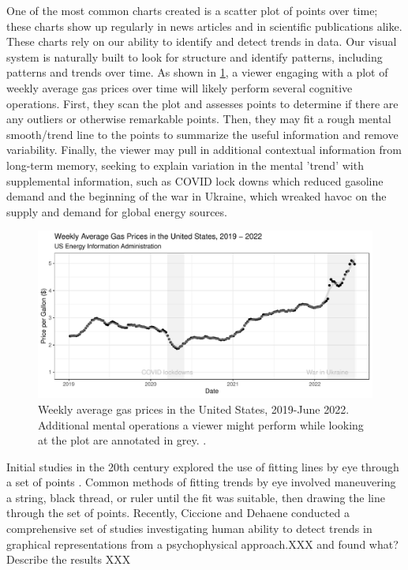 \documentclass[10pt]{article}
\begin{document}
{\textcolor{RedOrange}{One of the most common charts created is a scatter plot of points over time; these charts show up regularly in news articles and in scientific publications alike.
These charts rely on our }}ability to identify and detect trends in
data. Our visual system is naturally built to look for structure and
identify patterns,
{\textcolor{RedOrange}{including patterns and trends over time}}.
{\textcolor{RedOrange}{As shown in \cref{fig:gas-prices}, a viewer engaging with a plot of weekly average gas prices over time will likely perform several cognitive operations. First, they scan the plot and assesses points to determine if there are any outliers or otherwise remarkable points. Then, they may fit a rough mental smooth/trend line to the points to summarize the useful information and remove variability. Finally, the viewer may pull in additional contextual information from long-term memory, seeking to explain variation in the mental 'trend' with supplemental information, such as COVID lock downs which reduced gasoline demand and the beginning of the war in Ukraine, which wreaked havoc on the supply and demand for global energy sources.}}

\begin{figure}

{\centering \includegraphics[width=\columnwidth]{./images/gas-prices-1} 

}

\caption{Weekly average gas prices in the United States, 2019-June 2022. Additional mental operations a viewer might perform while looking at the plot are annotated in grey. \cite{usenergyinformationadministrationWeeklyAllGrades2022}.}\label{fig:gas-prices}
\end{figure}

Initial studies in the 20th century explored the use of fitting lines by
eye through a set of points
\cite{finney1951subjective,mosteller1981eye}. Common methods of fitting
trends by eye involved maneuvering a string, black thread, or ruler
until the fit was suitable, then drawing the line through the set of
points. Recently, Ciccione and Dehaene 
conducted a comprehensive set of studies investigating human ability to
detect trends in graphical representations from a psychophysical
approach.{\textcolor{RedOrange}{XXX and found what? Describe the results XXX}}
\end{document}
